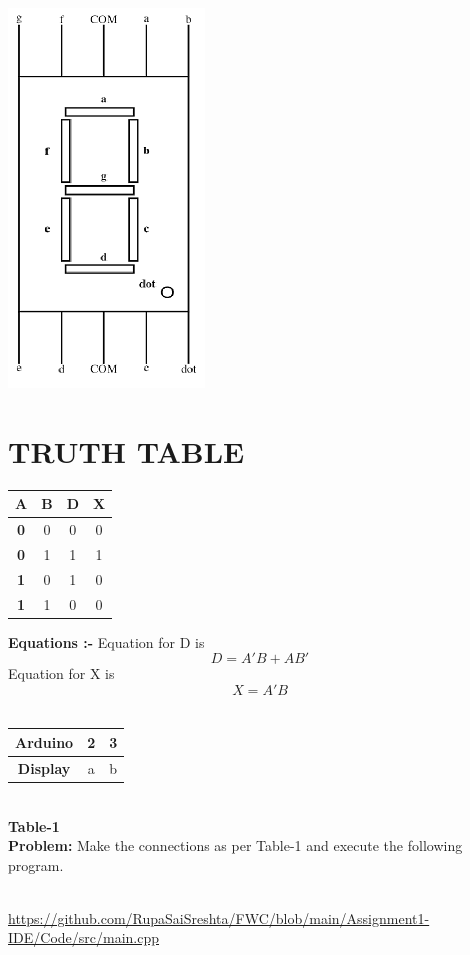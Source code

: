 \documentclass{article}
\begin{document}
\begin{tableofcontents}
\includegraphics[scale=1.5]{sevenseg.png}
\\

\section{TRUTH TABLE}
\vspace{7mm}
\begin{tabular}{|c||c||c||c|}
\hline
\textbf{A} & {B} & {D} & {X}\\
\hline
\textbf{0} & {0} & {0} & {0}\\
\textbf{0} & {1} & {1} & {1}\\
\textbf{1} & {0} & {1} & {0}\\
\textbf{1} & {1} & {0} & {0}\\
\hline
\end{tabular}
\newline
\newline
\newline
\textbf{Equations :-}
\newline
\newline
Equation for D is
\begin{equation}
D= A'B+AB'
\end{equation}
Equation for X is
\begin{equation}
X=A'B
\end{equation}
\\
\begin{tabular}{|c|c|c|}
\hline
\textbf{Arduino} & 2 & 3  \\
\hline
\textbf{Display} & {a} & {b}  \\
\hline
\end{tabular}
\\
\centering
\textbf{Table-1}
\centering
\\
\textbf{Problem:}
Make the connections as per Table-1 and execute the following program.
\end{tableofcontents}
\\
\vspace{1cm}
\href{https://github.com/RupaSaiSreshta/FWC/blob/main/Assignment1-IDE/Code/src/main.cpp}{https://github.com/RupaSaiSreshta/FWC/blob/main/Assignment1-IDE/Code/src/main.cpp}
\end{document}

